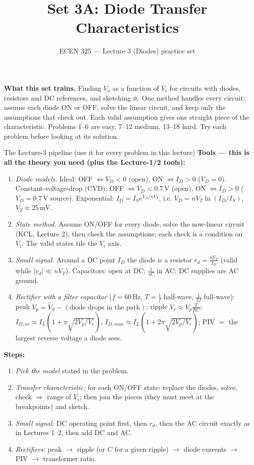 \documentclass[11pt]{article}
\title{Set 3A: Diode Transfer Characteristics}
\author{ECEN 325 --- Lecture 3 (Diodes) practice set}
\date{}
\begin{document}
\maketitle

\textbf{What this set trains.} Finding $V_o$ as a function of $V_i$ for circuits with diodes, resistors and DC
references, and sketching it. One method handles every circuit: assume each diode ON or OFF, solve the linear
circuit, and keep only the assumptions that check out. Each valid assumption gives one straight piece of the
characteristic. Problems 1--6 are easy, 7--12 medium, 13--18 hard. Try each problem before looking at its solution.


\begin{cardbox}{The Lecture-3 pipeline (use it for every problem in this lecture)}
\textbf{Tools --- this is all the theory you need (plus the Lecture-1/2 tools):}
\begin{enumerate}[label=\textbf{T\arabic*},leftmargin=2.2em,itemsep=1pt]
\item \emph{Diode models.} Ideal: OFF $\Leftrightarrow V_D<0$ (open), ON $\Leftrightarrow I_D>0$ ($V_D=0$).
      Constant-voltage-drop (CVD): OFF $\Leftrightarrow V_D<0.7$\,V (open), ON $\Leftrightarrow I_D>0$ ($V_D=0.7$\,V source).
      Exponential: $I_D = I_S e^{V_D/nV_T}$, i.e. $V_D = nV_T\ln(I_D/I_S)$, $V_T\approx 25$\,mV.
\item \emph{State method.} Assume ON/OFF for every diode, solve the now-linear circuit (KCL, Lecture 2), then check
      the assumptions; each check is a condition on $V_i$. The valid states tile the $V_i$ axis.
\item \emph{Small signal.} Around a DC point $I_D$ the diode is a resistor $r_d = \frac{nV_T}{I_D}$
      (valid while $|v_d|\ll nV_T$). Capacitors: open at DC; $\frac{1}{sC}$ in AC; DC supplies are AC ground.
\item \emph{Rectifier with a filter capacitor} ($f=60$\,Hz, $T = \frac{1}{f}$ half-wave, $\frac{1}{2f}$ full-wave):
      peak $V_p=\hat V_S - (\text{diode drops in the path})$; ripple $V_r \approx V_p\frac{T}{RC}$;
      $I_{D,av} \approx I_L\left(1+\pi\sqrt{2V_p/V_r}\right)$, $I_{D,max}\approx I_L\left(1+2\pi\sqrt{2V_p/V_r}\right)$;
      PIV $=$ the largest reverse voltage a diode sees.
\end{enumerate}
\textbf{Steps:}
\begin{enumerate}[leftmargin=2.2em,itemsep=1pt]
\item \emph{Pick the model} stated in the problem.
\item \emph{Transfer characteristic:} for each ON/OFF state: replace the diodes, solve, check $\Rightarrow$ range of $V_i$;
      then join the pieces (they must meet at the breakpoints) and sketch.
\item \emph{Small signal:} DC operating point first, then $r_d$, then the AC circuit exactly as in Lectures 1--2,
      then add DC and AC.
\item \emph{Rectifiers:} peak $\to$ ripple (or $C$ for a given ripple) $\to$ diode currents $\to$ PIV $\to$ transformer ratio.
\end{enumerate}
\end{cardbox}
\end{document}
